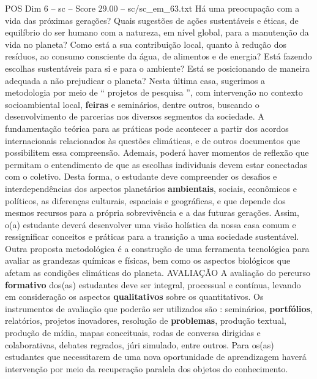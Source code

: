 \begin{textsample}{POS Dim 6 – sc – Score 29.00 – sc/sc\_em\_63.txt}
Há uma preocupação com a vida das próximas gerações?
Quais sugestões de ações sustentáveis e éticas, de equilíbrio do ser humano com a natureza, em nível global, para a manutenção da vida no planeta?
Como está a sua contribuição local, quanto à redução dos resíduos, ao consumo consciente da água, de alimentos e de energia?
Está fazendo escolhas sustentáveis para si e para o ambiente?
Está se posicionando de maneira adequada a não prejudicar o planeta?
Nesta última casa, sugerimos a metodologia por meio de “ projetos de pesquisa ”, com intervenção no contexto socioambiental local, \textbf{feiras} e seminários, dentre outros, buscando o desenvolvimento de parcerias nos diversos segmentos da sociedade.
A fundamentação teórica para as práticas pode acontecer a partir dos acordos internacionais relacionados às questões climáticas, e de outros documentos que possibilitem essa compreensão.
Ademais, poderá haver momentos de reflexão que permitam o entendimento de que as escolhas individuais devem estar conectadas com o coletivo.
Desta forma, o estudante deve compreender os desafios e interdependências dos aspectos planetários \textbf{ambientais}, sociais, econômicos e políticos, as diferenças culturais, espaciais e geográficas, e que depende dos mesmos recursos para a própria sobrevivência e a das futuras gerações.
Assim, o(a) estudante deverá desenvolver uma visão holística da nossa casa comum e ressignificar conceitos e práticas para a transição a uma sociedade sustentável.
Outra proposta metodológica é a construção de uma ferramenta tecnológica para avaliar as grandezas químicas e físicas, bem como os aspectos biológicos que afetam as condições climáticas do planeta.
AVALIAÇÃO A avaliação do percurso \textbf{formativo} dos(as) estudantes deve ser integral, processual e contínua, levando em consideração os aspectos \textbf{qualitativos} sobre os quantitativos.
Os instrumentos de avaliação que poderão ser utilizados são : seminários, \textbf{portfólios}, relatórios, projetos inovadores, resolução de \textbf{problemas}, produção textual, produção de mídia, mapas conceituais, rodas de conversa dirigidas e colaborativas, debates regrados, júri simulado, entre outros.
Para os(as) estudantes que necessitarem de uma nova oportunidade de aprendizagem haverá intervenção por meio da recuperação paralela dos objetos do conhecimento.

\end{textsample}
